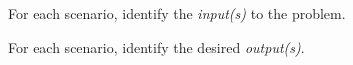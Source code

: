 \documentclass{tufte-handout}
\begin{document}
\begin{questions}




\item For each scenario, identify the \emph{input(s)} to the problem.
  \begin{subquestions}
  \item \mbox{}
  \item \mbox{}
  \item \mbox{}
  \item \mbox{}
  \item \mbox{}
  \end{subquestions}

\item For each scenario, identify the desired \emph{output(s)}.
  \begin{subquestions}
  \item \mbox{}
  \item \mbox{}
  \item \mbox{}
  \item \mbox{}
  \item \mbox{}
  \end{subquestions}


\end{questions}
\end{document}
